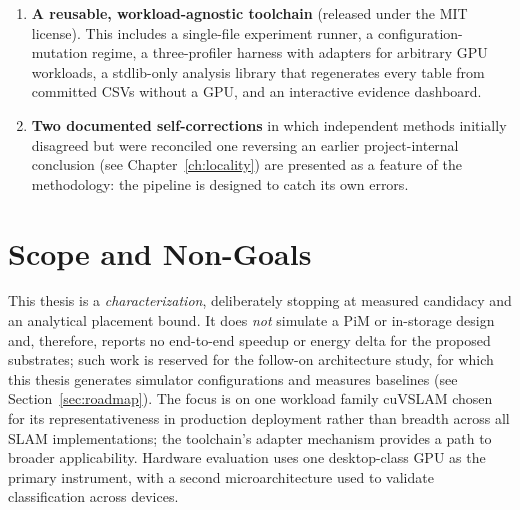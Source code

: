 \begin{enumerate}
\item \textbf{A reusable, workload-agnostic toolchain} (released under the MIT license). This includes a single-file experiment runner, a configuration-mutation regime, a three-profiler harness with adapters for arbitrary GPU workloads, a stdlib-only analysis library that regenerates every table from committed CSVs without a GPU, and an interactive evidence dashboard.

\item \textbf{Two documented self-corrections} in which independent methods initially disagreed but were reconciled one reversing an earlier project-internal conclusion (see Chapter~\ref{ch:locality}) are presented as a feature of the methodology: the pipeline is designed to catch its own errors.

\end{enumerate}

\section{Scope and Non-Goals}
This thesis is a \emph{characterization}, deliberately stopping at measured candidacy and an analytical placement bound. It does \emph{not} simulate a PiM or in-storage design and, therefore, reports no end-to-end speedup or energy delta for the proposed substrates; such work is reserved for the follow-on architecture study, for which this thesis generates simulator configurations and measures baselines (see Section~\ref{sec:roadmap}). The focus is on one workload family cuVSLAM chosen for its representativeness in production deployment rather than breadth across all SLAM implementations; the toolchain's adapter mechanism provides a path to broader applicability. Hardware evaluation uses one desktop-class GPU as the primary instrument, with a second microarchitecture used to validate classification across devices.

